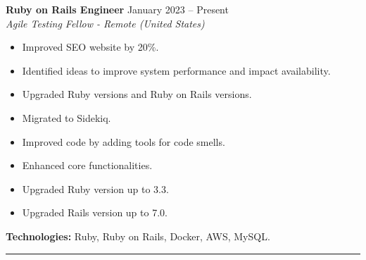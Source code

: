 \textbf{Ruby on Rails Engineer} \hfill January 2023 -- Present\\
\textit{Agile Testing Fellow - Remote (United States)}\\
\begin{itemize}
    \setlength{\itemsep}{0pt} %
    \setlength{\topsep}{0pt}  %
    \setlength{\parsep}{0pt}  %
    \setlength{\partopsep}{0pt} %
    \item Improved SEO website by 20\%.
    \item Identified ideas to improve system performance and impact availability.
    \item Upgraded Ruby versions and Ruby on Rails versions.
    \item Migrated to Sidekiq.
    \item Improved code by adding tools for code smells.
    \item Enhanced core functionalities.
    \item Upgraded Ruby version up to 3.3.
    \item Upgraded Rails version up to 7.0.
\end{itemize}
\textbf{Technologies:} Ruby, Ruby on Rails, Docker, AWS, MySQL.
\hrule
\vspace{1em}
